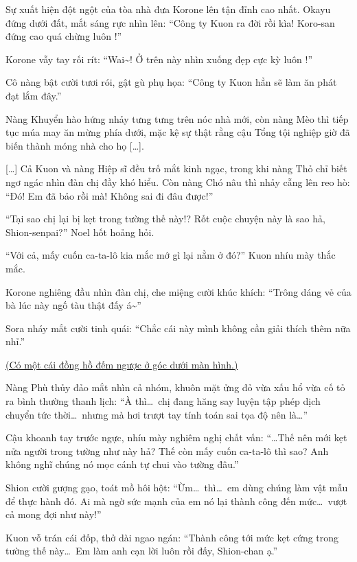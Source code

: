 \documentclass[../main.tex]{subfiles}
\begin{document}
Sự xuất hiện đột ngột của tòa nhà đưa Korone lên tận đỉnh cao nhất. Okayu đứng dưới đất, mắt sáng rực nhìn lên: ``Công ty Kuon ra đời rồi kìa! Koro-san đứng cao quá chừng luôn !''

Korone vẫy tay rối rít: ``Wai\~{}! Ở trên này nhìn xuống đẹp cực kỳ luôn !''

Cô nàng bật cười tươi rói, gật gù phụ họa: ``Công ty Kuon hẳn sẽ làm ăn phát đạt lắm đây.''

Nàng Khuyển hào hứng nhảy tưng tưng trên nóc nhà mới, còn nàng Mèo thì tiếp tục múa may ăn mừng phía dưới, mặc kệ sự thật rằng cậu Tổng tội nghiệp giờ đã biến thành móng nhà cho họ [\dots].


[\dots] Cả Kuon và nàng Hiệp sĩ đều trố mắt kinh ngạc, trong khi nàng Thỏ chỉ biết ngơ ngác nhìn đàn chị đầy khó hiểu. Còn nàng Chó nâu thì nhảy cẫng lên reo hò: ``Đó! Em đã bảo rồi mà! Không sai đi đâu được!''

``Tại sao chị lại bị kẹt trong tường thế này!? Rốt cuộc chuyện này là sao hả, Shion-senpai?'' Noel hốt hoảng hỏi.

``Với cả, mấy cuốn ca-ta-lô kia mắc mớ gì lại nằm ở đó?'' Kuon nhíu mày thắc mắc.

Korone nghiêng đầu nhìn đàn chị, che miệng cười khúc khích: ``Trông dáng vẻ của bà lúc này ngố tàu thật đấy á\~{}''

Sora nháy mắt cười tinh quái: ``Chắc cái này mình không cần giải thích thêm nữa nhỉ.''

\begin{center}
  \uline{(Có một cái đồng hồ đếm ngược ở góc dưới màn hình.)}
\end{center}

Nàng Phù thủy đảo mắt nhìn cả nhóm, khuôn mặt ửng đỏ vừa xấu hổ vừa cố tỏ ra bình thường thanh lịch: ``À thì\dots\ chị đang hăng say luyện tập phép dịch chuyển tức thời\dots\ nhưng mà hơi trượt tay tính toán sai tọa độ nên là\dots''

Cậu khoanh tay trước ngực, nhíu mày nghiêm nghị chất vấn: ``\dots Thế nên mới kẹt nửa người trong tường như này hả? Thế còn mấy cuốn ca-ta-lô thì sao? Anh không nghĩ chúng nó mọc cánh tự chui vào tường đâu.''

Shion cười gượng gạo, toát mồ hôi hột: ``Ừm\dots\ thì\dots\ em dùng chúng làm vật mẫu để thực hành đó. Ai mà ngờ sức mạnh của em nó lại thành công đến mức\dots\ vượt cả mong đợi như này!''

Kuon vỗ trán cái đốp, thở dài ngao ngán: ``Thành công tới mức kẹt cứng trong tường thế này\dots\ Em làm anh cạn lời luôn rồi đấy, Shion-chan ạ.''
\end{document}

